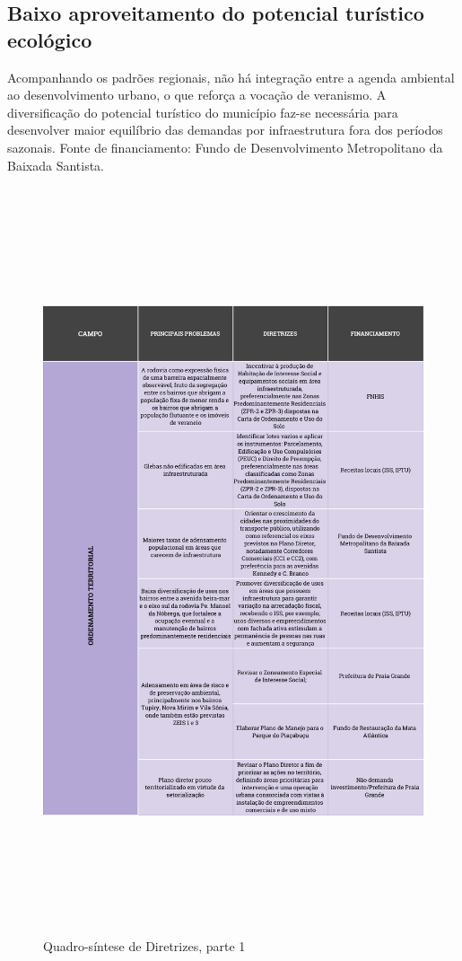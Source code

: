 	\subsection{Baixo aproveitamento do potencial turístico ecológico}

	Acompanhando os padrões regionais, não há integração entre a agenda ambiental ao desenvolvimento urbano, o que reforça a vocação de veranismo. A diversificação do potencial turístico do município faz-se necessária para desenvolver maior equilíbrio das demandas por infraestrutura fora dos períodos sazonais. 
    Fonte de financiamento: Fundo de Desenvolvimento Metropolitano da Baixada Santista.
    
	\begin{figure}[h]
		\centering
		\caption{Quadro-síntese de Diretrizes, parte 1}
		\includegraphics[width=22cm,height=22cm,keepaspectratio]{img/dir01.png}
	\end{figure}

